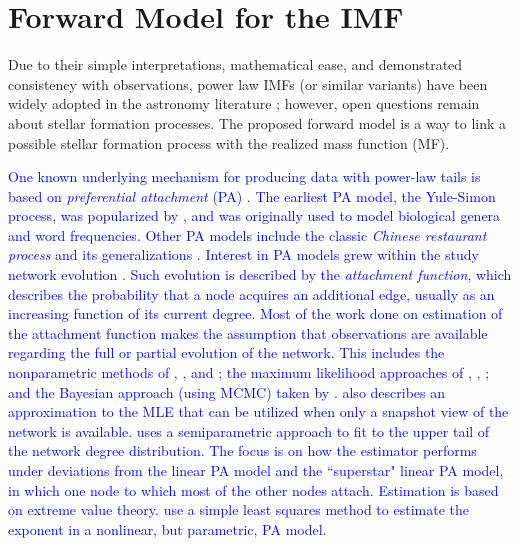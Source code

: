 \documentclass[ejs]{imsart}
\numberwithin{equation}{section}
\theoremstyle{plain}
\begin{document}


\section{Forward Model for the IMF}
\label{PAmodelSection}
Due to their simple interpretations, mathematical ease, and demonstrated consistency with observations, power law IMFs (or similar variants) have been widely adopted in the astronomy literature \citep{kroupa2012}; however, open questions remain about stellar formation processes.  The proposed forward model is a way to link a possible stellar formation process with the realized mass function (MF).  

\textcolor{blue}{
One known underlying mechanism for producing data with power-law tails is based on {\em preferential attachment} (PA) \citep{Mitzenmacher2004}.  
The earliest PA model, the Yule-Simon process, was popularized by \cite{simon55}, and was originally used to model biological genera and word frequencies. Other PA models include the classic {\it Chinese restaurant process}
and its generalizations \citep{Bloem2017}.
Interest in PA models grew within the study network evolution
\citep{BarabasiAlbert1999}.
Such evolution is described by the {\it attachment function}, which
describes the probability that a node acquires an additional edge,
usually as an increasing function of its current degree.
Most of the work done on estimation of the attachment function
makes the assumption that observations are available regarding
the full or partial evolution of the network.
This includes the nonparametric methods of 
\cite{Jeong2003}, \cite{Newman2001}, and \cite{Pham2015};
the maximum likelihood approaches of 
\cite{Gomez2011}, \cite{Wan2017a}, \cite{Onodera2014}; and
the Bayesian approach (using MCMC) taken by \cite{Sheridan2012}.
\cite{Wan2017a} also describes 
an approximation to the MLE that can be utilized when only a snapshot view of
the network is available.
\cite{Wan2017b} uses a semiparametric approach to fit to the upper tail of the
network degree distribution. The focus is on how the estimator performs
under deviations from the linear PA model and the ``superstar" linear PA
model, in which one node to which most of the other nodes attach. Estimation 
is based on extreme value theory.
\cite{Kunegis2013} use a simple least squares method to estimate the exponent
in a nonlinear, but parametric, PA model.}
\end{document}
